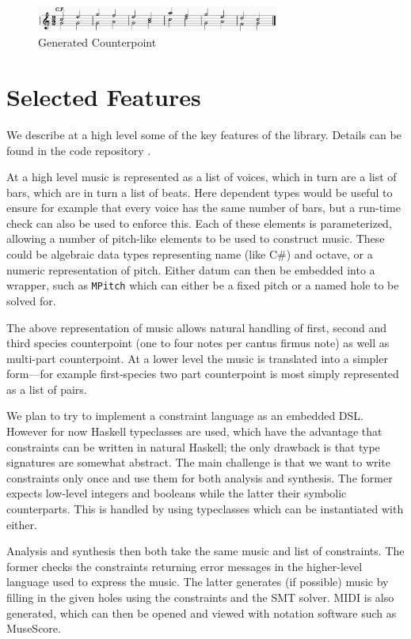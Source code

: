 \documentclass[sigplan,screen]{acmart}
\begin{document}
\begin{figure}
  \includegraphics[width=8cm]{figures/b146gen3.png}
  \caption{Generated Counterpoint}
  \label{fig:b146gen3}
\end{figure}


\section{Selected Features}

We describe at a high level some of the key features of the
library. Details can be found in the code repository
\citep{HaskellCounterpoint}.

At a high level music is represented as a list of voices, which in
turn are a list of bars, which are in turn a list of beats. Here
dependent types would be useful to ensure for example that every voice
has the same number of bars, but a run-time check can also be used to
enforce this. Each of these elements is parameterized, allowing a
number of pitch-like elements to be used to construct music. These
could be algebraic data types representing name (like C\#) and
octave, or a numeric representation of pitch. Either datum can then be
embedded into a wrapper, such as \texttt{MPitch} which can either be a
fixed pitch or a named hole to be solved for.

The above representation of music allows natural handling of first,
second and third species counterpoint (one to four notes per cantus
firmus note) as well as multi-part counterpoint. At a lower level the
music is translated into a simpler form---for example first-species
two part counterpoint is most simply represented as a list of pairs.

We plan to try to implement a constraint language as an embedded
DSL. However for now Haskell typeclasses are used, which have the
advantage that constraints can be written in natural Haskell; the only
drawback is that type signatures are somewhat abstract. The main
challenge is that we want to write constraints only once and use them
for both analysis and synthesis. The former expects low-level integers
and booleans while the latter their symbolic counterparts. This is
handled by using typeclasses which can be instantiated with either.

Analysis and synthesis then both take the same music and list of
constraints. The former checks the constraints returning error
messages in the higher-level language used to express the music. The
latter generates (if possible) music by filling in the given holes
using the constraints and the SMT solver. MIDI is also generated,
which can then be opened and viewed with notation software such as
MuseScore.
\end{document}
